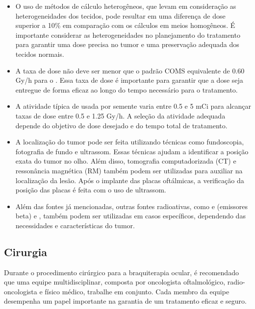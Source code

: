 \documentclass[11pt,a4paper]{article}
\begin{document}
\begin{itemize}
    \item O uso de métodos de cálculo heterogêneos, que levam em consideração as heterogeneidades dos tecidos, pode resultar em uma diferença de dose superior a 10\% em comparação com os cálculos em meios homogêneos. É importante considerar as heterogeneidades no planejamento do tratamento para garantir uma dose precisa no tumor e uma preservação adequada dos tecidos normais.
    
    \item A taxa de dose não deve ser menor que o padrão COMS equivalente de 0.60 Gy/h para o . Essa taxa de dose é importante para garantir que a dose seja entregue de forma eficaz ao longo do tempo necessário para o tratamento.
    
    \item A atividade típica de  usada por semente varia entre 0.5 e 5 mCi para alcançar taxas de dose entre 0.5 e 1.25 Gy/h. A seleção da atividade adequada depende do objetivo de dose desejado e do tempo total de tratamento.
    
    \item A localização do tumor pode ser feita utilizando técnicas como fundoscopia, fotografia de fundo e ultrassom. Essas técnicas ajudam a identificar a posição exata do tumor no olho. Além disso, tomografia computadorizada (CT) e ressonância magnética (RM) também podem ser utilizadas para auxiliar na localização da lesão. Após o implante das placas oftálmicas, a verificação da posição das placas é feita com o uso de ultrassom.
    
    \item Além das fontes já mencionadas, outras fontes radioativas, como  e  (emissores beta) e , também podem ser utilizadas em casos específicos, dependendo das necessidades e características do tumor.
    \end{itemize}


\subsection*{Cirurgia}

    Durante o procedimento cirúrgico para a braquiterapia ocular, é recomendado que uma equipe multidisciplinar, composta por oncologista oftalmológico, radio-oncologista e físico médico, trabalhe em conjunto. Cada membro da equipe desempenha um papel importante na garantia de um tratamento eficaz e seguro.
\end{document}
